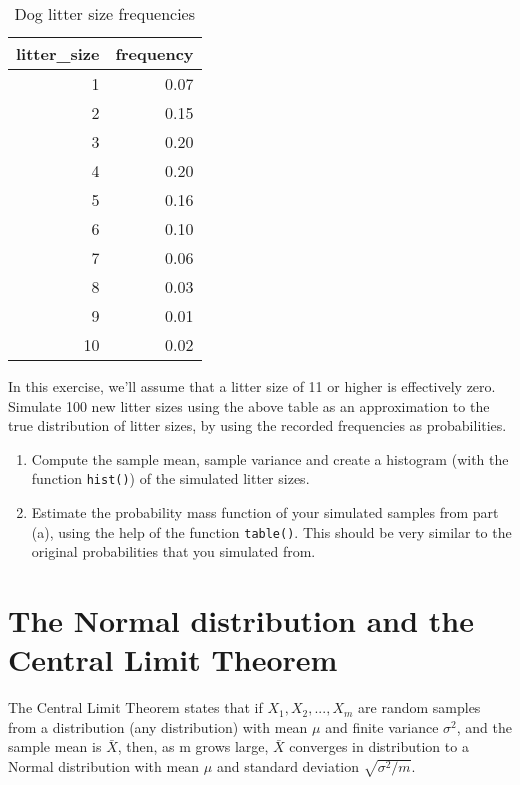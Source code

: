 \documentclass[
]{book}
\begin{document}
\begin{table}

\caption{\label{tab:unnamed-chunk-21}Dog litter size frequencies}
\centering
\begin{tabular}[t]{r|r}
\hline
litter\_size & frequency\\
\hline
1 & 0.07\\
\hline
2 & 0.15\\
\hline
3 & 0.20\\
\hline
4 & 0.20\\
\hline
5 & 0.16\\
\hline
6 & 0.10\\
\hline
7 & 0.06\\
\hline
8 & 0.03\\
\hline
9 & 0.01\\
\hline
10 & 0.02\\
\hline
\end{tabular}
\end{table}

In this exercise, we'll assume that a litter size of 11 or higher is effectively zero. Simulate 100 new litter sizes using the above table as an approximation to the true distribution of litter sizes, by using the recorded frequencies as probabilities.

\begin{enumerate}
\def\labelenumi{\alph{enumi})}
\item
  Compute the sample mean, sample variance and create a histogram (with the function \texttt{hist()}) of the simulated litter sizes.
\item
  Estimate the probability mass function of your simulated samples from part (a), using the help of the function \texttt{table()}. This should be very similar to the original probabilities that you simulated from.
\end{enumerate}

\hypertarget{the-normal-distribution-and-the-central-limit-theorem}{%
\section{The Normal distribution and the Central Limit Theorem}\label{the-normal-distribution-and-the-central-limit-theorem}}

The Central Limit Theorem states that if \(X_1, X_2, ..., X_m\) are random samples from a distribution (any distribution) with mean \(\mu\) and finite variance \(\sigma^2\), and the sample mean is \(\bar{X}\), then, as m grows large, \(\bar{X}\) converges in distribution to a Normal distribution with mean \(\mu\) and standard deviation \(\sqrt{\sigma^2 /m}\).
\end{document}
